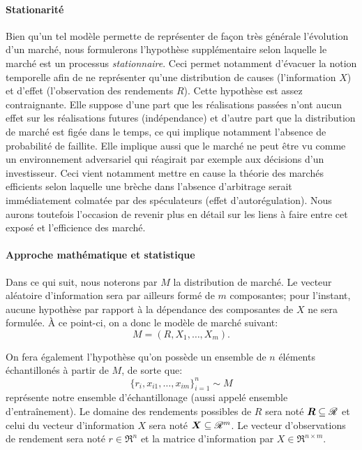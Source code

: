 \paragraph{Stationarité}

Bien qu'un tel modèle permette de représenter de façon très générale l'évolution d'un
marché, nous formulerons l'hypothèse supplémentaire selon laquelle le marché est un
processus \textit{stationnaire}. Ceci permet notamment d'évacuer la notion temporelle afin
de ne représenter qu'une distribution de causes (l'information $X$) et d'effet
(l'observation des rendements $R$). Cette hypothèse est assez contraignante. Elle suppose
d'une part que les réalisations passées n'ont aucun effet sur les réalisations futures
(indépendance) et d'autre part que la distribution de marché est figée dans le temps, ce
qui implique notamment l'absence de probabilité de faillite. Elle implique aussi que le
marché ne peut être vu comme un environnement adversariel qui réagirait par exemple aux
décisions d'un investisseur. Ceci vient notamment mettre en cause la théorie des marchés
efficients selon laquelle une brèche dans l'absence d'arbitrage serait immédiatement
colmatée par des spéculateurs (effet d'autorégulation). Nous aurons toutefois l'occasion
de revenir plus en détail sur les liens à faire entre cet exposé et l'efficience des
marché.

\paragraph{Approche mathématique et statistique}

Dans ce qui suit, nous noterons par $M$ la distribution de marché. Le vecteur aléatoire
d'information sera par ailleurs formé de $m$ composantes; pour l'instant, aucune hypothèse
par rapport à la dépendance des composantes de $X$ ne sera formulée. À ce point-ci, on a
donc le modèle de marché suivant:
\begin{equation}
  M = (R,X_1, \ldots, X_m).
\end{equation}

On fera également l'hypothèse qu'on possède un ensemble de $n$ éléments échantillonés à
partir de $M$, de sorte que:
\begin{equation}
  \{r_i, x_{i1}, \ldots, x_{im}\}_{i=1}^n \sim M
\end{equation}
représente notre ensemble d'échantillonage (aussi appelé ensemble d'entraînement). Le
domaine des rendements possibles de $R$ sera noté $\bm{R} \subseteq \mathscr{R}$ et celui du vecteur
d'information $X$ sera noté $\bm{X} \subseteq \mathscr{R}^m$. Le vecteur d'observations de rendement sera noté
$r \in \Re^n$ et la matrice d'information par $X \in \Re^{n \times m}$.



